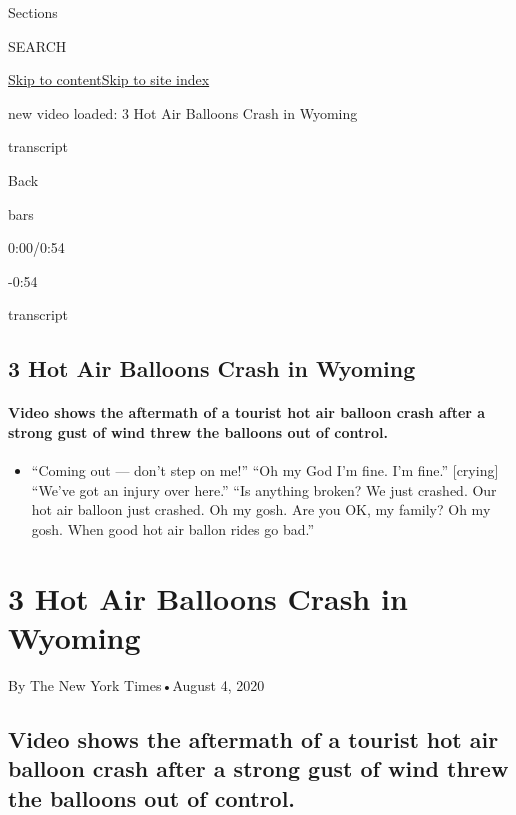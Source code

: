 Sections

SEARCH

\protect\hyperlink{site-content}{Skip to
content}\protect\hyperlink{site-index}{Skip to site index}

new video loaded: 3 Hot Air Balloons Crash in Wyoming

transcript

Back

bars

0:00/0:54

-0:54

transcript

\hypertarget{3-hot-air-balloons-crash-in-wyoming}{%
\subsection{3 Hot Air Balloons Crash in
Wyoming}\label{3-hot-air-balloons-crash-in-wyoming}}

\hypertarget{video-shows-the-aftermath-of-a-tourist-hot-air-balloon-crash-after-a-strong-gust-of-wind-threw-the-balloons-out-of-control}{%
\paragraph{Video shows the aftermath of a tourist hot air balloon crash
after a strong gust of wind threw the balloons out of
control.}\label{video-shows-the-aftermath-of-a-tourist-hot-air-balloon-crash-after-a-strong-gust-of-wind-threw-the-balloons-out-of-control}}

\begin{itemize}
\tightlist
\item
  ``Coming out --- don't step on me!'' ``Oh my God I'm fine. I'm fine.''
  {[}crying{]} ``We've got an injury over here.'' ``Is anything broken?
  We just crashed. Our hot air balloon just crashed. Oh my gosh. Are you
  OK, my family? Oh my gosh. When good hot air ballon rides go bad.''
\end{itemize}

\hypertarget{3-hot-air-balloons-crash-in-wyoming-1}{%
\section{3 Hot Air Balloons Crash in
Wyoming}\label{3-hot-air-balloons-crash-in-wyoming-1}}

By The New York Times•August 4, 2020

\hypertarget{video-shows-the-aftermath-of-a-tourist-hot-air-balloon-crash-after-a-strong-gust-of-wind-threw-the-balloons-out-of-control-1}{%
\subsection{Video shows the aftermath of a tourist hot air balloon crash
after a strong gust of wind threw the balloons out of
control.}\label{video-shows-the-aftermath-of-a-tourist-hot-air-balloon-crash-after-a-strong-gust-of-wind-threw-the-balloons-out-of-control-1}}

